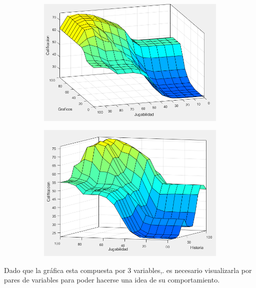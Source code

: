 \documentclass[11pt, letterpaper]{article}
\begin{document}
\begin{figure}[h]
	\centering
	\begin{subfigure}{0.42\textwidth} %
		\centering
		\includegraphics[width=1.3\textwidth]{IMG/P17.png}
		\label{fig:G31}
	\end{subfigure}
	\hfill
	\begin{subfigure}{0.42\textwidth} %
		\centering
		\includegraphics[width=1.2\textwidth]{IMG/P18.png}
		\label{fig:G41}
	\end{subfigure}
	\label{fig:comparacion21}
\end{figure}

Dado que la gráfica esta compuesta por 3 variables,. es necesario visualizarla por pares de variables para poder hacerse una idea de su comportamiento.
\end{document}
